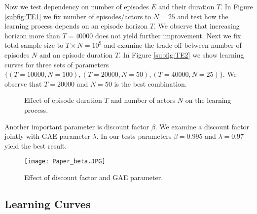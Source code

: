 \documentclass[11pt]{article}
\theoremstyle{definition}
\numberwithin{equation}{section}
\begin{document}
Now we test dependency on number of episodes $E$ and their duration $T$. In Figure \ref{subfig:TE1} we fix number of episodes/actors to $N=25$ and test how the learning process depends on an episode horizon $T$. We observe that increasing horizon more than $T=40000$ does not yield further improvement. Next we fix total sample size to $T\times N = 10^9$ and examine the trade-off between number of episodes $N$ and an episode duration $T$.    In Figure \ref{subfig:TE2} we show learning curves for three sets of parameters $\{(T=10000, N=100), (T=20000, N=50), (T=40000, N=25)\}$. We observe that $ T=20000$ and $N=50$ is the best combination.


   \begin{figure}[!ht]
     \hfill
     \caption{Effect of episode duration $T$ and number of actors $N$ on the learning process. }
     \label{fig:TE}
   \end{figure}



Another important parameter is discount factor $\beta$. We examine a discount factor jointly with GAE parameter $\lambda.$ In our tests parameters $\beta = 0.995$ and $\lambda = 0.97$ yield the best result.


\begin{figure}[H]
\centering%
\texttt{[image: Paper\_beta.JPG]}
\caption[]{Effect of discount factor and GAE parameter.  }
\label{fig:beta}%
\end{figure}


\subsection{Learning Curves}
\end{document}
